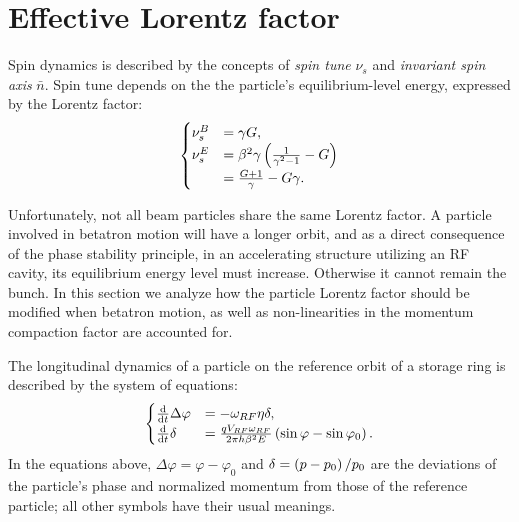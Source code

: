 \documentclass[a4paper]{jacow}
\newcommand{\w}{\omega}
\newcommand{\nbar}{\bar n}
\newcommand{\D}{\Delta}
\begin{document}
\section{Effective Lorentz factor}
Spin dynamics is described by the concepts of \emph{spin tune} $\nu_s$ and \emph{invariant spin axis} $\nbar$.
Spin tune depends on the the particle's  equilibrium-level energy, expressed by the Lorentz factor:
\begin{equation}\label{eq:spin_tune_vs_gamma}
  \begin{cases}
    \nu_s^B &= \gamma G, \\
    \nu_s^E &= \beta^2\gamma\bkt{\frac{1}{\gamma^2-1} - G} \\
            &= \frac{G+1}{\gamma} - G\gamma.
  \end{cases}
\end{equation}

Unfortunately, not all beam particles share the same Lorentz factor. A particle involved in betatron
motion will have a longer orbit, and as a direct consequence of the phase stability principle,
in an accelerating structure utilizing an RF cavity, its equilibrium energy level 
must increase. Otherwise it cannot remain the bunch. In this section we analyze how the particle Lorentz factor
should be modified when betatron motion, as well as non-linearities in the momentum compaction factor are
accounted for.

The longitudinal dynamics of a particle on the reference orbit of a storage ring is described
by the system of equations:
\begin{equation}
  \begin{cases}
    \ddt{}\D\varphi &= -\w_{RF}\eta\delta, \\
    \ddt{}\delta &= \frac{q V_{RF}\w_{RF}}{2\pi h\beta^2E}\bkt{\sin\varphi - \sin\varphi_0}.
  \end{cases}
\end{equation}
In the equations above, $\D\varphi = \varphi - \varphi_0$ and
$\delta = \bkt{p-p_0}/{p_0}$ are the deviations of the particle's phase and
normalized momentum from those of the reference particle; all other symbols have their usual meanings.
\end{document}

